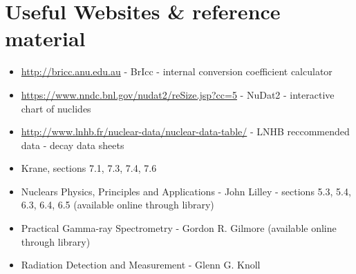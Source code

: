 \documentclass[12pt]{article}
\begin{document}
\section*{Useful Websites \& reference material}
\begin{itemize}
    \item \href{http://bricc.anu.edu.au}{http://bricc.anu.edu.au} - BrIcc - internal conversion coefficient calculator
    \item \href{https://www.nndc.bnl.gov/nudat2/reSize.jsp?cc=5}{https://www.nndc.bnl.gov/nudat2/reSize.jsp?cc=5} - NuDat2 - interactive chart of nuclides
    \item \href{http://www.lnhb.fr/nuclear-data/nuclear-data-table}{http://www.lnhb.fr/nuclear-data/nuclear-data-table/} - LNHB reccommended data - decay data sheets
    \item Krane, sections 7.1, 7.3, 7.4, 7.6
    \item Nuclears Physics, Principles and Applications - John Lilley - sections 5.3, 5.4, 6.3, 6.4, 6.5 (available online through library)
    \item Practical Gamma-ray Spectrometry - Gordon R. Gilmore (available online through library)
    \item Radiation Detection and Measurement - Glenn G. Knoll
\end{itemize}
\end{document}
